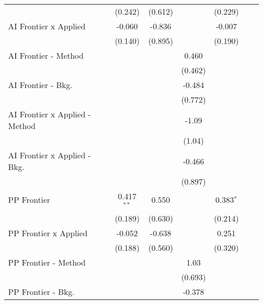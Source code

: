 \begin{tabular}{lcccccc}
                                  & (0.242)      & (0.612) &             & (0.229)      &        &   \\   
   AI Frontier x Applied          & -0.060       & -0.836  &             & -0.007       &        &   \\   
                                  & (0.140)      & (0.895) &             & (0.190)      &        &   \\   
   AI Frontier - Method           &              &         & 0.460       &              &        &   \\   
                                  &              &         & (0.462)     &              &        &   \\   
   AI Frontier - Bkg.             &              &         & -0.484      &              &        &   \\   
                                  &              &         & (0.772)     &              &        &   \\   
   AI Frontier x Applied - Method &              &         & -1.09       &              &        &   \\   
                                  &              &         & (1.04)      &              &        &   \\   
   AI Frontier x Applied - Bkg.   &              &         & -0.466      &              &        &   \\   
                                  &              &         & (0.897)     &              &        &   \\   
   PP Frontier                    & 0.417$^{**}$ & 0.550   &             & 0.383$^{*}$  &        &   \\   
                                  & (0.189)      & (0.630) &             & (0.214)      &        &   \\   
   PP Frontier x Applied          & -0.052       & -0.638  &             & 0.251        &        &   \\   
                                  & (0.188)      & (0.560) &             & (0.320)      &        &   \\   
   PP Frontier - Method           &              &         & 1.03        &              &        &   \\   
                                  &              &         & (0.693)     &              &        &   \\   
   PP Frontier - Bkg.             &              &         & -0.378      &              &        &   \\   

\end{tabular}
